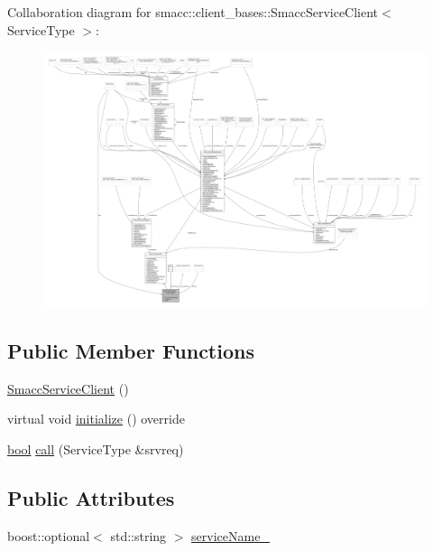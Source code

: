 Collaboration diagram for smacc\+:\+:client\+\_\+bases\+:\+:Smacc\+Service\+Client$<$ Service\+Type $>$\+:
\nopagebreak
\begin{figure}[H]
\begin{center}
\leavevmode
\includegraphics[width=350pt]{classsmacc_1_1client__bases_1_1SmaccServiceClient__coll__graph}
\end{center}
\end{figure}
\subsection*{Public Member Functions}
\begin{DoxyCompactItemize}
\item 
\hyperlink{classsmacc_1_1client__bases_1_1SmaccServiceClient_ab041a903fa40cb5df251f0cd437604cc}{Smacc\+Service\+Client} ()
\item 
virtual void \hyperlink{classsmacc_1_1client__bases_1_1SmaccServiceClient_aa51b80828e4ab19627210440ae15b6f3}{initialize} () override
\item 
\hyperlink{classbool}{bool} \hyperlink{classsmacc_1_1client__bases_1_1SmaccServiceClient_a0e9914f45f1091c38bb9ad6187d07977}{call} (Service\+Type \&srvreq)
\end{DoxyCompactItemize}
\subsection*{Public Attributes}
\begin{DoxyCompactItemize}
\item 
boost\+::optional$<$ std\+::string $>$ \hyperlink{classsmacc_1_1client__bases_1_1SmaccServiceClient_a63732ec406cb8b6f65bbdbb73e01c7ab}{service\+Name\+\_\+}
\end{DoxyCompactItemize}

